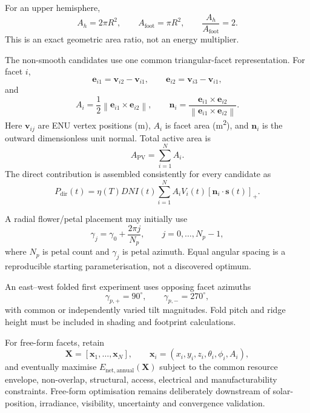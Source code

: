 \documentclass[11pt,a4paper]{article}
\begin{document}
For an upper hemisphere,
\begin{equation}
A_h=2\pi R^2,\qquad A_{\mathrm{foot}}=\pi R^2,\qquad
\frac{A_h}{A_{\mathrm{foot}}}=2.
\end{equation}
This is an exact geometric area ratio, not an energy multiplier.

The non-smooth candidates use one common triangular-facet representation. For facet \(i\),
\begin{equation}
\mathbf e_{i1}=\mathbf v_{i2}-\mathbf v_{i1},\qquad
\mathbf e_{i2}=\mathbf v_{i3}-\mathbf v_{i1},
\end{equation}
and
\begin{equation}
A_i=\frac12\left\|\mathbf e_{i1}\times\mathbf e_{i2}\right\|,\qquad
\mathbf n_i=
\frac{\mathbf e_{i1}\times\mathbf e_{i2}}
{\left\|\mathbf e_{i1}\times\mathbf e_{i2}\right\|}.
\end{equation}
Here \(\mathbf v_{ij}\) are ENU vertex positions (m), \(A_i\) is facet area (\si{\square\metre}), and \(\mathbf n_i\) is the outward dimensionless unit normal. Total active area is
\begin{equation}
A_{\mathrm{PV}}=\sum_{i=1}^{N}A_i.
\end{equation}
The direct contribution is assembled consistently for every candidate as
\begin{equation}
P_{\mathrm{dir}}(t)=
\eta(T)DNI(t)
\sum_{i=1}^{N}
A_iV_i(t)[\mathbf n_i\cdot\mathbf s(t)]_+.
\end{equation}

A radial flower/petal placement may initially use
\begin{equation}
\gamma_j=\gamma_0+\frac{2\pi j}{N_p},\qquad j=0,\ldots,N_p-1,
\end{equation}
where \(N_p\) is petal count and \(\gamma_j\) is petal azimuth. Equal angular spacing is a reproducible starting parameterisation, not a discovered optimum.

An east--west folded first experiment uses opposing facet azimuths
\begin{equation}
\gamma_{p,+}=90^\circ,\qquad \gamma_{p,-}=270^\circ,
\end{equation}
with common or independently varied tilt magnitudes. Fold pitch and ridge height must be included in shading and footprint calculations.

For free-form facets, retain
\begin{equation}
\mathbf X=[\mathbf x_1,\ldots,\mathbf x_N],\qquad
\mathbf x_i=(x_i,y_i,z_i,\theta_i,\phi_i,A_i),
\end{equation}
and eventually maximise \(E_{\mathrm{net,annual}}(\mathbf X)\) subject to the common resource envelope, non-overlap, structural, access, electrical and manufacturability constraints. Free-form optimisation remains deliberately downstream of solar-position, irradiance, visibility, uncertainty and convergence validation.
\end{document}
